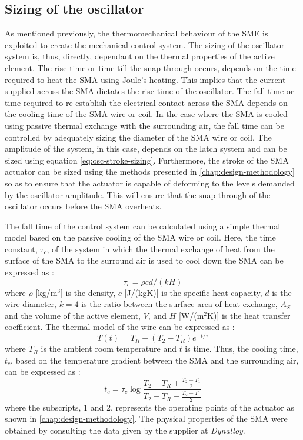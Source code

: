 \subsection{Sizing of the oscillator}\label{subsec:thermal-sizing}
As mentioned previously, the thermomechanical behaviour of the SME is exploited to create the mechanical control system. The sizing of the oscillator system is, thus, directly, dependant on the thermal properties of the active element. The rise time or time till the snap-through occurs, depends on the time required to heat the SMA using Joule's heating. This implies that the current supplied across the SMA dictates the rise time of the oscillator. The fall time or time required to re-establish the electrical contact across the SMA depends on the cooling time of the SMA wire or coil. In the case where the SMA is cooled using passive thermal exchange with the surrounding air, the fall time can be controlled by adequately sizing the diameter of the SMA wire or coil. The amplitude of the system, in this case, depends on the latch system and can be sized using equation \ref{eq:osc-stroke-sizing}. Furthermore, the stroke of the SMA actuator can be sized using the methods presented in \cref{chap:design-methodology} so as to ensure that the actuator is capable of deforming to the levels demanded by the oscillator amplitude. This will ensure that the snap-through of the oscillator occurs before the SMA overheats.

The fall time of the control system can be calculated using a simple thermal model based on the passive cooling of the SMA wire or coil. Here, the time constant, $\tau_c$, of the system in which the thermal exchange of heat from the surface of the SMA to the surround air is used to cool down the SMA can be expressed as :
\begin{equation}\label{eq:tau}
  \tau_c = \rho cd/(kH)
\end{equation}
where $\rho$ [kg/m$^3$] is the density, $c$ [J/(kgK)] is the specific heat capacity, $d$ is the wire diameter, $k = 4$ is the ratio between the surface area of heat exchange, $A_S$ and the volume of the active element, $V$, and $H$ [W/(m$^2$K)] is the heat transfer coefficient. The thermal model of the wire can be expressed as :
\begin{equation}\label{eq:thermalmodel}
  T(t) = T_R + (T_2-T_R)e^{-t/\tau}
\end{equation}
where $T_R$ is the ambient room temperature and $t$ is time. Thus, the cooling time, $t_c$, based on the temperature gradient between the SMA and the surrounding air, can be expressed as :
\begin{equation}\label{eq:coolingtime}
  t_c = \tau_c\log{\frac{T_2-T_R+\frac{T_2-T_1}{2}}{T_2-T_R-\frac{T_2-T_1}{2}}}
\end{equation}
where the subscripts, 1 and 2, represents the operating points of the actuator as shown in \cref{chap:design-methodology}. The physical properties of the SMA were obtained by consulting the data given by the supplier at \textit{Dynalloy}.

